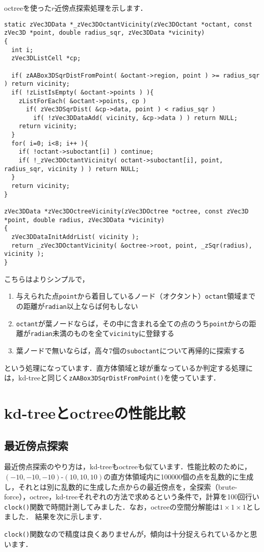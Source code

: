 ﻿\documentclass[a4paper]{jsarticle}
\begin{document}
octreeを使った$r$近傍点探索処理を示します．
\begin{screen}
\begin{verbatim}
static zVec3DData *_zVec3DOctantVicinity(zVec3DOctant *octant, const zVec3D *point, double radius_sqr, zVec3DData *vicinity)
{
  int i;
  zVec3DListCell *cp;

  if( zAABox3DSqrDistFromPoint( &octant->region, point ) >= radius_sqr ) return vicinity;
  if( !zListIsEmpty( &octant->points ) ){
    zListForEach( &octant->points, cp )
      if( zVec3DSqrDist( &cp->data, point ) < radius_sqr )
        if( !zVec3DDataAdd( vicinity, &cp->data ) ) return NULL;
    return vicinity;
  }
  for( i=0; i<8; i++ ){
    if( !octant->suboctant[i] ) continue;
    if( !_zVec3DOctantVicinity( octant->suboctant[i], point, radius_sqr, vicinity ) ) return NULL;
  }
  return vicinity;
}

zVec3DData *zVec3DOctreeVicinity(zVec3DOctree *octree, const zVec3D *point, double radius, zVec3DData *vicinity)
{
  zVec3DDataInitAddrList( vicinity );
  return _zVec3DOctantVicinity( &octree->root, point, _zSqr(radius), vicinity );
}
\end{verbatim}
\end{screen}
こちらはよりシンプルで，
\begin{enumerate}
\item 与えられた点\verb|point|から着目しているノード（オクタント）\verb|octant|領域までの距離が\verb|radian|以上ならば何もしない
\item \verb|octant|が葉ノードならば，その中に含まれる全ての点のうち\verb|point|からの距離が\verb|radian|未満のものを全て\verb|vicinity|に登録する
\item 葉ノードで無いならば，高々7個の\verb|suboctant|について再帰的に探索する
\end{enumerate}
という処理になっています．直方体領域と球が重なっているか判定する処理には，kd-treeと同じく\verb|zAABox3DSqrDistFromPoint()|を使っています．


\section{kd-treeとoctreeの性能比較}

\subsection{最近傍点探索}

最近傍点探索のやり方は，kd-treeもoctreeも似ています．性能比較のために，$(-10,-10,-10)$-$(10,10,10)$の直方体領域内に100000個の点を乱数的に生成し，それとは別に乱数的に生成した点からの最近傍点を，全探索（brute-force），octree，kd-treeそれぞれの方法で求めるという条件で，計算を100回行い\verb|clock()|関数で時間計測してみました．なお，octreeの空間分解能は$1\times1\times1$としました．
結果を次に示します．
\begin{figure*}[h]
\centering

\end{figure*}
\verb|clock()|関数なので精度は良くありませんが，傾向は十分捉えられているかと思います．
\end{document}
